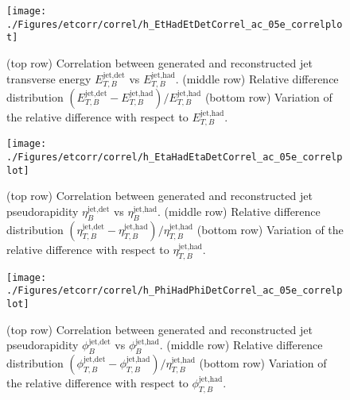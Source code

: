 \begin{figure}[p]
	\centering	\texttt{[image: ./Figures/etcorr/correl/h\_EtHadEtDetCorrel\_ac\_05e\_correlplot]}
	\caption{(top row) Correlation between generated and reconstructed jet transverse energy $E_{T,B}^\text{jet,det}$ vs $E_{T,B}^\text{jet,had}$. (middle row) Relative difference distribution $\left(E_{T,B}^\text{jet,det} - E_{T,B}^\text{jet,had}\right)/E_{T,B}^\text{jet,had}$ (bottom row) Variation of the relative difference with respect to $E_{T,B}^\text{jet,had}$.}
	\label{fig:h_EtHadEtDetCorrel_05e_correlplot}
\end{figure}

\begin{figure}[p]
	\centering	\texttt{[image: ./Figures/etcorr/correl/h\_EtaHadEtaDetCorrel\_ac\_05e\_correlplot]}
	\caption{(top row) Correlation between generated and reconstructed jet pseudorapidity $\eta_{B}^\text{jet,det}$ vs $\eta_{B}^\text{jet,had}$. (middle row) Relative difference distribution $\left(\eta_{T,B}^\text{jet,det} - \eta_{T,B}^\text{jet,had}\right)/\eta_{T,B}^\text{jet,had}$ (bottom row) Variation of the relative difference with respect to $\eta_{T,B}^\text{jet,had}$.}
	\label{fig:h_EtaHadEtDetCorrel_05e_correlplot}
\end{figure}

\begin{figure}[p]
	\centering	\texttt{[image: ./Figures/etcorr/correl/h\_PhiHadPhiDetCorrel\_ac\_05e\_correlplot]}
	\caption{(top row) Correlation between generated and reconstructed jet pseudorapidity $\phi_{B}^\text{jet,det}$ vs $\phi_{B}^\text{jet,had}$. (middle row) Relative difference distribution $\left(\phi_{T,B}^\text{jet,det} - \phi_{T,B}^\text{jet,had}\right)/\eta_{T,B}^\text{jet,had}$ (bottom row) Variation of the relative difference with respect to $\phi_{T,B}^\text{jet,had}$.}
	\label{fig:h_PhiHadEtDetCorrel_05e_correlplot}
\end{figure}